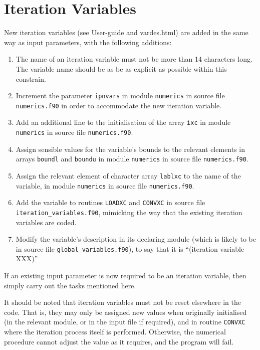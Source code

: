 \documentclass[11pt,a4paper]{report}
\begin{document}
\section{Iteration Variables}

New iteration variables (see User-guide and vardes.html) are added in the
same way as input parameters, with the following additions:

\begin{enumerate}

\item The name of an iteration variable must not be more than 14 characters long.
  The variable name should be as be as explicit as possible within this constrain.

\item Increment the parameter \texttt{ipnvars} in module \texttt{numerics} in
  source file \texttt{numerics.f90} in order to accommodate the new iteration
  variable.

\item Add an additional line to the initialisation of the array \texttt{ixc}
  in module \texttt{numerics} in source file \texttt{numerics.f90}.

\item Assign sensible values for the variable's bounds to the relevant
  elements in arrays \texttt{boundl} and \texttt{boundu} in module
  \texttt{numerics} in source file \texttt{numerics.f90}.

\item Assign the relevant element of character array \texttt{lablxc} to the
  name of the variable, in module \texttt{numerics} in source file
  \texttt{numerics.f90}.

\item Add the variable to routines \texttt{LOADXC} and \texttt{CONVXC} in
  source file \texttt{iteration\_variables.f90}, mimicking the way that the
  existing iteration variables are coded.

\item Modify the variable's description in its declaring module (which is
  likely to be in source file \texttt{global\_variables.f90}), to say that it
  is ``(iteration variable XXX)''
	
\end{enumerate}

If an existing input parameter is now required to be an iteration variable,
then simply carry out the tasks mentioned here.

It should be noted that iteration variables must not be reset elsewhere in the
code. That is, they may only be assigned new values when originally
initialised (in the relevant module, or in the input file if required), and in
routine \texttt{CONVXC} where the iteration process itself is performed.
Otherwise, the numerical procedure cannot adjust the value as it requires, and
the program will fail.
\end{document}
